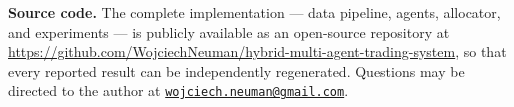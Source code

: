 \noindent\textbf{Source code.} The complete implementation --- data pipeline, agents, allocator, and experiments --- is publicly available as an open-source repository at \url{https://github.com/WojciechNeuman/hybrid-multi-agent-trading-system}, so that every reported result can be independently regenerated. Questions may be directed to the author at \href{mailto:wojciech.neuman@gmail.com}{\nolinkurl{wojciech.neuman@gmail.com}}.
